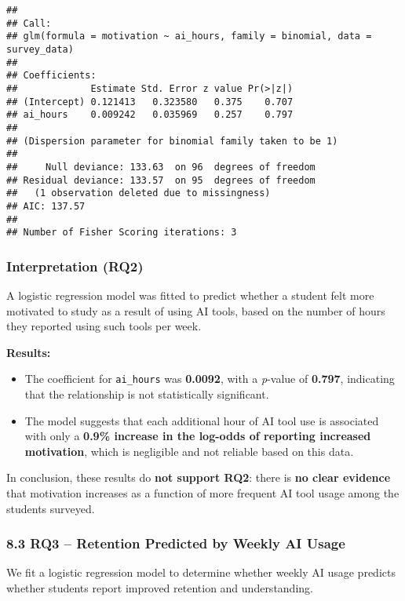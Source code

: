 \documentclass[
]{article}
\providecommand{\tightlist}{%
  \setlength{\itemsep}{0pt}\setlength{\parskip}{0pt}}
\begin{document}
\begin{verbatim}
## 
## Call:
## glm(formula = motivation ~ ai_hours, family = binomial, data = survey_data)
## 
## Coefficients:
##             Estimate Std. Error z value Pr(>|z|)
## (Intercept) 0.121413   0.323580   0.375    0.707
## ai_hours    0.009242   0.035969   0.257    0.797
## 
## (Dispersion parameter for binomial family taken to be 1)
## 
##     Null deviance: 133.63  on 96  degrees of freedom
## Residual deviance: 133.57  on 95  degrees of freedom
##   (1 observation deleted due to missingness)
## AIC: 137.57
## 
## Number of Fisher Scoring iterations: 3
\end{verbatim}

\subsubsection{Interpretation (RQ2)}\label{interpretation-rq2}

A logistic regression model was fitted to predict whether a student felt
more motivated to study as a result of using AI tools, based on the
number of hours they reported using such tools per week.

\textbf{Results:}

\begin{itemize}
\tightlist
\item
  The coefficient for \texttt{ai\_hours} was \textbf{0.0092}, with a
  \emph{p}-value of \textbf{0.797}, indicating that the relationship is
  not statistically significant.
\item
  The model suggests that each additional hour of AI tool use is
  associated with only a \textbf{0.9\% increase in the log-odds of
  reporting increased motivation}, which is negligible and not reliable
  based on this data.
\end{itemize}

In conclusion, these results do \textbf{not support RQ2}: there is
\textbf{no clear evidence} that motivation increases as a function of
more frequent AI tool usage among the students surveyed.

\subsubsection{8.3 RQ3 -- Retention Predicted by Weekly AI
Usage}\label{rq3-retention-predicted-by-weekly-ai-usage}

We fit a logistic regression model to determine whether weekly AI usage
predicts whether students report improved retention and understanding.
\end{document}
